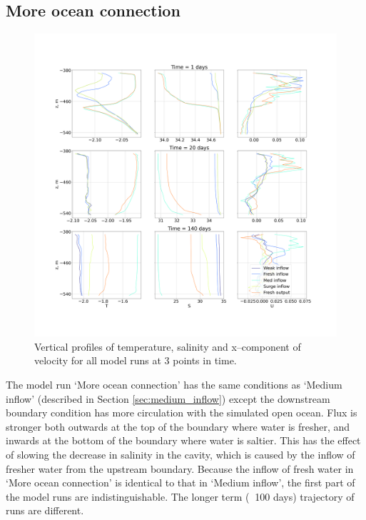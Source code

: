 \subsection{More ocean connection} \label{sec:fresh_output}


\begin{figure}[!ht]
\centering
\includegraphics[width=1\textwidth]{chapters/4/compare_all_TSU.png}
\caption[Compare all TSU]{Vertical profiles of temperature, salinity and x--component of velocity for all model runs at 3 points in time.}
\label{fig:compare_all_TSU}
\end{figure}

The model run `More ocean connection' has the same conditions  as `Medium inflow' (described in Section \ref{sec:medium_inflow})  except the downstream boundary condition has more circulation with the simulated open ocean. Flux is stronger both outwards at the top of the boundary where water is fresher, and inwards at the bottom of the boundary where water is saltier. This has the effect of slowing the decrease in salinity in the cavity, which is caused by the inflow of fresher water from the upstream boundary. Because the inflow of fresh water in `More ocean connection' is identical to that in `Medium inflow', the first part of the model runs are indistinguishable. The longer term ($\>$ 100 days) trajectory of runs are different.

